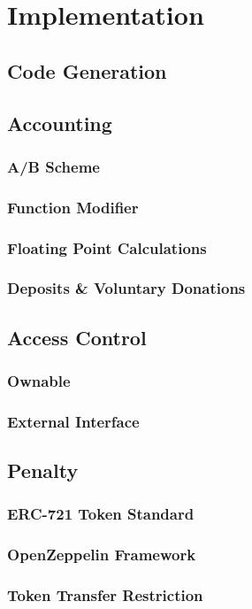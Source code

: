 
\chapter{Implementation}
\label{chp:implementation}

\section{Code Generation}

\section{Accounting}

\subsection{A/B Scheme}
\subsection{Function Modifier}
\subsection{Floating Point Calculations}
\subsection{Deposits \& Voluntary Donations}

\section{Access Control}
\subsection{Ownable}
\subsection{External Interface}

\section{Penalty}
\subsection{ERC-721 Token Standard}
\subsection{OpenZeppelin Framework}
\subsection{Token Transfer Restriction}